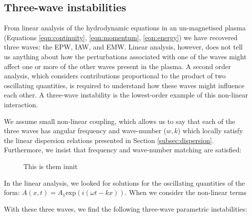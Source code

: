 \subsection{Three-wave instabilities}
From linear analysis of the hydrodynamic equations in an un-magnetised plasma (Equations \ref{eqn:continuity}, \ref{eqn:momentum}, \ref{eqn:energy}) we have recovered three waves: the \acrshort{EPW}, \acrshort{IAW}, and \acrshort{EMW}. Linear analysis, however, does not tell us anything about how the perturbations associated with one of the waves might affect one or more of the other waves present in the plasma. A second order analysis, which considers contributions proportional to the product of two oscillating quantities, is required to understand how these waves might influence each other. A three-wave instability is the lowest-order example of this non-linear interaction.


We assume small non-linear coupling, which allows us to say that each of the three waves has angular frequency and wave-number ($w,k$) which locally satisfy the linear dispersion relations presented in Section \ref{subsec:dispersion}. Furthermore, we insist that frequency and wave-number matching are satisfied:




\begin{figure}[ht]
   \centering
    \caption{This is them innit}
    \label{fig:3wave_instabilities}
\end{figure}{}


 In the linear analysis, we looked for solutions for the oscillating quantities of the form: $A(x,t) = A_1\text{exp}(i(\omega t - kx))$. When we consider the non-linear terms

With these three waves, we find the following three-wave parametric instabilities:




